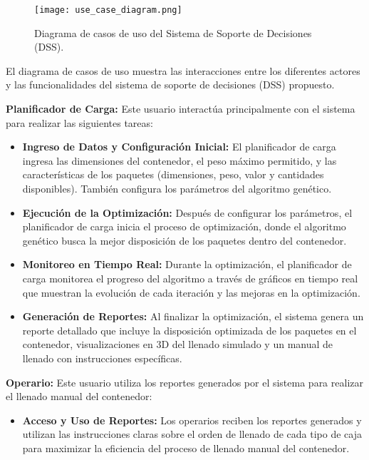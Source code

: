 \documentclass[9pt,a4paper]{rho}
\begin{document}
\begin{figure}[h!]
    \centering
    \texttt{[image: use\_case\_diagram.png]}
    \caption{Diagrama de casos de uso del Sistema de Soporte de Decisiones (DSS).}
    \label{fig:use_case_diagram}
\end{figure}

El diagrama de casos de uso muestra las interacciones entre los diferentes actores y las funcionalidades del sistema de soporte de decisiones (DSS) propuesto.

\textbf{Planificador de Carga:} Este usuario interactúa principalmente con el sistema para realizar las siguientes tareas:
\begin{itemize}[itemsep=.5em]
    \item \textbf{Ingreso de Datos y Configuración Inicial:} El planificador de carga ingresa las dimensiones del contenedor, el peso máximo permitido, y las características de los paquetes (dimensiones, peso, valor y cantidades disponibles). También configura los parámetros del algoritmo genético.
    \item \textbf{Ejecución de la Optimización:} Después de configurar los parámetros, el planificador de carga inicia el proceso de optimización, donde el algoritmo genético busca la mejor disposición de los paquetes dentro del contenedor.
    \item \textbf{Monitoreo en Tiempo Real:} Durante la optimización, el planificador de carga monitorea el progreso del algoritmo a través de gráficos en tiempo real que muestran la evolución de cada iteración y las mejoras en la optimización.
    \item \textbf{Generación de Reportes:} Al finalizar la optimización, el sistema genera un reporte detallado que incluye la disposición optimizada de los paquetes en el contenedor, visualizaciones en 3D del llenado simulado y un manual de llenado con instrucciones específicas.
\end{itemize}

\textbf{Operario:} Este usuario utiliza los reportes generados por el sistema para realizar el llenado manual del contenedor:
\begin{itemize}
    \item \textbf{Acceso y Uso de Reportes:} Los operarios reciben los reportes generados y utilizan las instrucciones claras sobre el orden de llenado de cada tipo de caja para maximizar la eficiencia del proceso de llenado manual del contenedor.
\end{itemize}
\end{document}
